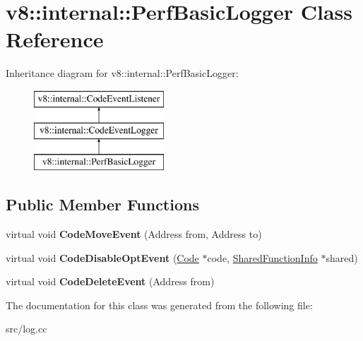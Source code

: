 \hypertarget{classv8_1_1internal_1_1_perf_basic_logger}{}\section{v8\+:\+:internal\+:\+:Perf\+Basic\+Logger Class Reference}
\label{classv8_1_1internal_1_1_perf_basic_logger}
Inheritance diagram for v8\+:\+:internal\+:\+:Perf\+Basic\+Logger\+:\begin{figure}[H]
\begin{center}
\leavevmode
\includegraphics[height=3.000000cm]{classv8_1_1internal_1_1_perf_basic_logger}
\end{center}
\end{figure}
\subsection*{Public Member Functions}
\begin{DoxyCompactItemize}
\item 
\hypertarget{classv8_1_1internal_1_1_perf_basic_logger_a6658ef6a28b55619f0df13d807a0975b}{}virtual void {\bfseries Code\+Move\+Event} (Address from, Address to)\label{classv8_1_1internal_1_1_perf_basic_logger_a6658ef6a28b55619f0df13d807a0975b}

\item 
\hypertarget{classv8_1_1internal_1_1_perf_basic_logger_ada895c9a98e605f3fbe0fddd118cbac3}{}virtual void {\bfseries Code\+Disable\+Opt\+Event} (\hyperlink{classv8_1_1internal_1_1_code}{Code} $\ast$code, \hyperlink{classv8_1_1internal_1_1_shared_function_info}{Shared\+Function\+Info} $\ast$shared)\label{classv8_1_1internal_1_1_perf_basic_logger_ada895c9a98e605f3fbe0fddd118cbac3}

\item 
\hypertarget{classv8_1_1internal_1_1_perf_basic_logger_a0694d561ceffc992c1a763b61b306841}{}virtual void {\bfseries Code\+Delete\+Event} (Address from)\label{classv8_1_1internal_1_1_perf_basic_logger_a0694d561ceffc992c1a763b61b306841}

\end{DoxyCompactItemize}


The documentation for this class was generated from the following file\+:\begin{DoxyCompactItemize}
\item 
src/log.\+cc\end{DoxyCompactItemize}
